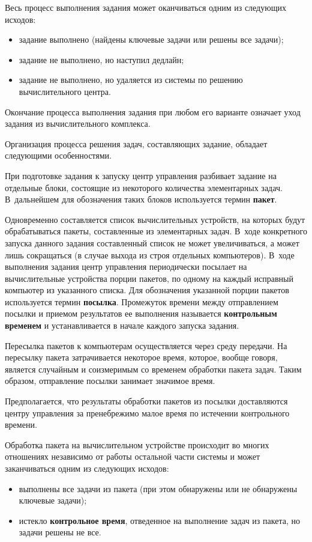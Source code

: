\begin{multicols}{2}
   Весь процесс выполнения задания может оканчиваться одним из 
следующих исходов:
   \begin{itemize}
   \item задание выполнено (найдены ключевые задачи или решены все 
задачи);
   \item задание не выполнено, но наступил дедлайн;
   \item задание не выполнено, но удаляется из системы по решению 
вычислительного центра.
   \end{itemize}
   
   Окончание процесса выполнения задания при любом его варианте 
означает уход задания из вы\-чис\-ли\-тельного комплекса.
   
   Организация процесса решения задач, со\-став\-ля\-ющих задание, обладает 
следующими особенностями.
   
   При подготовке задания к запуску центр управ\-ле\-ния разбивает задание 
на отдельные блоки, со\-сто\-ящие из некоторого количества элементарных 
задач. В~дальнейшем для обозначения таких блоков используется термин 
\textbf{пакет}.
   
   Одновременно составляется список вычислительных устройств, на 
которых будут обрабатываться пакеты, составленные из элементарных 
задач. В~ходе конкретного запуска данного задания со\-став\-лен\-ный список не 
может увеличиваться, а может лишь сокращаться (в случае выхода из строя 
отдельных компьютеров). В~ходе выполнения задания центр 
   управ\-ле\-ния периодически посылает на вы\-чис\-ли\-тель\-ные устрой\-ст\-ва 
порции пакетов, по одному на каждый исправный компьютер из указанного 
списка. Для обозначения указанной порции пакетов используется термин 
\textbf{посылка}. Промежуток времени между отправлением посылки и 
приемом результатов ее выполнения называется \textbf{контрольным 
временем} и устанавливается в начале каждого запуска задания.
   
   Пересылка пакетов к компьютерам осуществляется через среду передачи. 
На пересылку пакета затрачивается некоторое время, которое, вообще 
говоря, является случайным и соизмеримым со временем обработки пакета 
задач. Таким образом, отправление посылки занимает значимое время.
   
   Предполагается, что результаты обработки пакетов из посылки 
доставляются центру управления за пренебрежимо малое время по 
истечении контрольного времени.
   
   Обработка пакета на вычислительном устройстве происходит во многих 
отношениях независимо от работы остальной части системы и может 
заканчиваться одним из следующих исходов:
   \begin{itemize}
   \item выполнены все задачи из пакета (при этом обнаружены или не 
обнаружены ключевые задачи);
   \item истекло \textbf{контрольное время}, отведенное на 
выполнение задач из пакета, но задачи решены не все.
   \end{itemize}
   

\end{multicols}
